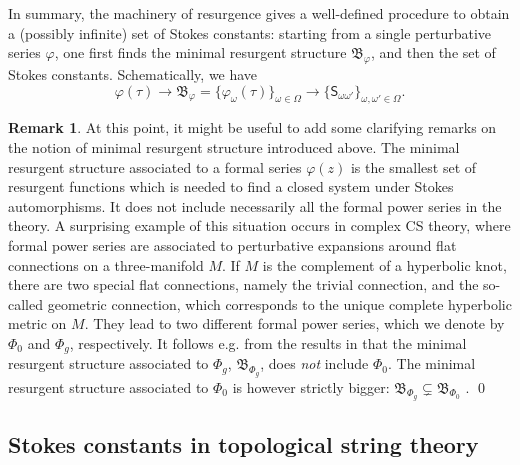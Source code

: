 \documentclass[a4paper,11pt]{article}
\theoremstyle{definition}
\newtheorem{remark}[theorem]{Remark}
\newcommand{\mS}{\mathsf{S}}
\newcommand{\be}{\begin{equation}}
\newcommand{\ee}{\end{equation}}
\begin{document}
In summary, the machinery of resurgence gives a well-defined procedure to 
obtain a (possibly infinite) set of Stokes constants: starting from a single perturbative series $\varphi$, 
one first finds the minimal resurgent structure $\mathfrak{B}_\varphi$, and then the set of Stokes constants. Schematically, we have
%
\be
\varphi(\tau) \longrightarrow \mathfrak{B}_\varphi=\{ \varphi_\omega(\tau) \}_{\omega \in \Omega} \longrightarrow \{ \mS_{\omega \omega'} \}_{\omega, \omega' \in \Omega}. 
\ee
%

 \begin{remark} At this point, it might be useful to add some clarifying remarks on the notion of minimal resurgent structure introduced above. 
 The minimal resurgent structure associated to a formal series $\varphi(z)$ is the smallest set of resurgent functions which 
is needed to find a closed system under Stokes automorphisms. It does not include necessarily all the formal power series in the theory. A surprising example of this situation occurs in complex CS theory, where formal power series are associated to perturbative expansions around flat connections on a three-manifold $M$. If $M$ is the complement of a hyperbolic knot, there are two special flat connections, namely the trivial connection, and the so-called geometric connection, which corresponds to the unique complete hyperbolic metric on $M$. They lead to two different formal power series, which we denote by $\Phi_0$ and $\Phi_g$, respectively. It follows e.g. from the results in \cite{witten-acs,ggm1, ggm2, gar-zag-2} that the minimal resurgent structure associated to $\Phi_g$, $\mathfrak{B}_{\Phi_g}$, 
does {\it not} include $\Phi_0$. The minimal 
resurgent structure associated to $\Phi_0$ is however 
strictly bigger: $\mathfrak{B}_{\Phi_g} \subsetneq \mathfrak{B}_{\Phi_0}$ \cite{garoufalidis,ggmw, gar-zag-2}. \qed
 
 \end{remark}

 \subsection{Stokes constants in topological string theory}
 \label{sc:S-topo}
\end{document}
